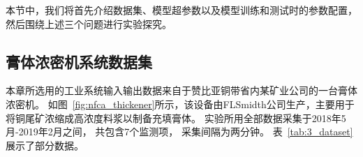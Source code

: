 本节中，我们将首先介绍数据集、模型超参数以及模型训练和测试时的参数配置，
然后围绕上述三个问题进行实验探究。

\subsection{膏体浓密机系统数据集}
\label{sec:paste_introduction}
本章所选用的工业系统输入输出数据来自于赞比亚铜带省内某矿业公司的一台膏体浓密机。
如图~\ref{fig:nfca_thickener}所示，该设备由FLSmidth公司生产，主要用于将铜尾矿浓缩成高浓度料浆以制备充填膏体。
实验所用全部数据采集于2018年5月-2019年2月之间，
共包含7个监测项，
采集间隔为两分钟。
表~\ref{tab:3_dataset}展示了部分数据。
